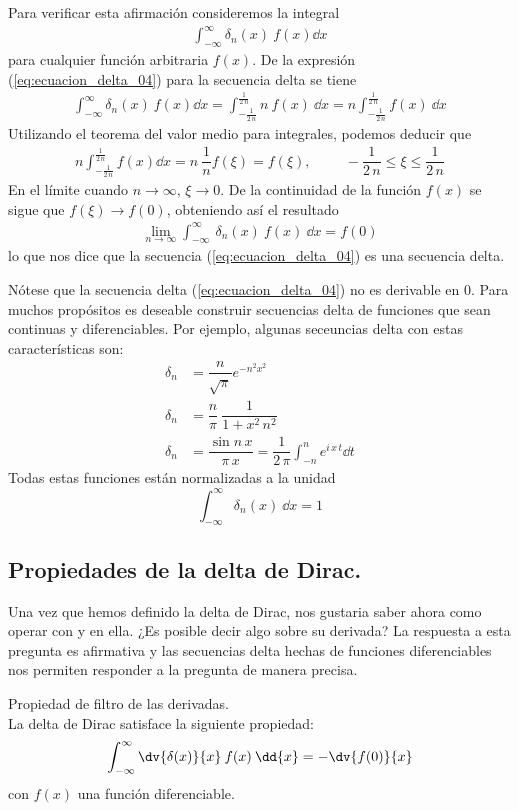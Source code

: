 Para verificar esta afirmación consideremos la integral
\begin{align*}
\int_{-\infty}^{\infty} \delta_{n} (x) \: f(x) \dd{x}
\end{align*}
para cualquier función arbitraria $f(x)$. De la expresión (\ref{eq:ecuacion_delta_04}) para la secuencia delta se tiene
\begin{align*}
\int_{-\infty}^{\infty} \delta_{n} (x) \: f(x) \dd{x} = \int_{-\frac{1}{2 \, n}}^{\frac{1}{2 \, n}} n \: f(x) \: \dd{x} = n \int_{-\frac{1}{2 \, n}}^{\frac{1}{2 \, n}} f(x) \:  \dd{x}
\end{align*}
Utilizando el teorema del valor medio para integrales, podemos deducir que
\begin{align*}
n \int_{-\frac{1}{2 \, n}}^{\frac{1}{2 \, n}} f(x) \dd{x} = n \: \dfrac{1}{n} f(\xi) = f(\xi), \hspace{1cm} - \dfrac{1}{2 \, n} \leq \xi \leq \dfrac{1}{2 \, n}
\end{align*}
En el límite cuando $n \to \infty$, $\xi \to 0$. De la continuidad de la función $f(x)$ se sigue que $f(\xi) \to f(0)$, obteniendo así el resultado
\begin{align*}
\lim_{n \to \infty} \int_{-\infty}^{\infty} \: \delta_{n}(x) \: f(x) \: \dd{x} = f(0)
\end{align*}
lo que nos dice que la secuencia (\ref{eq:ecuacion_delta_04}) es una secuencia delta.
\par
Nótese que la secuencia delta (\ref{eq:ecuacion_delta_04}) no es derivable en $0$. Para muchos propósitos es deseable
construir secuencias delta de funciones que sean continuas y diferenciables. Por ejemplo, algunas seceuncias delta con estas características son:
\begin{align*}
\delta_{n} &= \dfrac{n}{\sqrt{\pi}} e^{-n^{2} x^{2}} \\
\delta_{n} &= \dfrac{n}{\pi} \: \dfrac{1}{1 + x^{2} \, n^{2}} \\
\delta_{n} &= \dfrac{\sin n \, x}{\pi \, x} = \dfrac{1}{2 \, \pi} \int_{-n}^{n} e^{i \, x \, t} \dd{t}
\end{align*}
Todas estas funciones están normalizadas a la unidad
\begin{equation}
\int_{- \infty}^{\infty} \delta_{n}(x) \: \dd{x} = 1
\label{eq:ecuacion_delta_05}
\end{equation}
\subsection{Propiedades de la delta de Dirac.}
Una vez que hemos definido la delta de Dirac, nos gustaria saber ahora como operar con y en ella. ¿Es posible decir algo sobre su derivada? La respuesta a esta pregunta es afirmativa y las secuencias delta hechas de funciones diferenciables nos permiten responder a la pregunta de manera precisa.
\begin{propiedad}
Propiedad de filtro de las derivadas.
\\
La delta de Dirac satisface la siguiente propiedad:
\[ \int_{-\infty}^{\infty} \dv{\delta(x)}{x} \: f(x) \: \dd{x} = - \dv{f(0)}{x} \]
con $f(x)$ una función diferenciable.
\end{propiedad}

